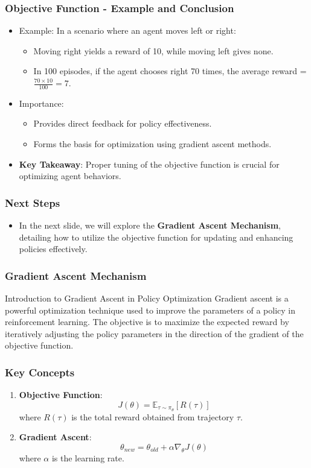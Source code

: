 \documentclass[aspectratio=169]{beamer}
\begin{document}
\begin{frame}[fragile]
  \frametitle{Objective Function - Example and Conclusion}
  \begin{itemize}
    \item Example: In a scenario where an agent moves left or right:
    \begin{itemize}
      \item Moving right yields a reward of 10, while moving left gives none.
      \item In 100 episodes, if the agent chooses right 70 times, the average reward = \( \frac{70 \times 10}{100} = 7 \).
    \end{itemize}
    \item Importance:
    \begin{itemize}
      \item Provides direct feedback for policy effectiveness.
      \item Forms the basis for optimization using gradient ascent methods.
    \end{itemize}
    \item \textbf{Key Takeaway}: Proper tuning of the objective function is crucial for optimizing agent behaviors.
  \end{itemize}
\end{frame}

\begin{frame}[fragile]
  \frametitle{Next Steps}
  \begin{itemize}
    \item In the next slide, we will explore the \textbf{Gradient Ascent Mechanism}, detailing how to utilize the objective function for updating and enhancing policies effectively.
  \end{itemize}
\end{frame}

\begin{frame}[fragile]
    \frametitle{Gradient Ascent Mechanism}
    \begin{block}{Introduction to Gradient Ascent in Policy Optimization}
        Gradient ascent is a powerful optimization technique used to improve the parameters of a policy in reinforcement learning. The objective is to maximize the expected reward by iteratively adjusting the policy parameters in the direction of the gradient of the objective function.
    \end{block}
\end{frame}

\begin{frame}[fragile]
    \frametitle{Key Concepts}
    \begin{enumerate}
        \item \textbf{Objective Function}:
        \[
        J(\theta) = \mathbb{E}_{\tau \sim \pi_\theta} [R(\tau)]
        \]
        where \(R(\tau)\) is the total reward obtained from trajectory \(\tau\).

        \item \textbf{Gradient Ascent}:
        \[
        \theta_{new} = \theta_{old} + \alpha \nabla_\theta J(\theta)
        \]
        where \(\alpha\) is the learning rate.
    \end{enumerate}
\end{frame}
\end{document}
